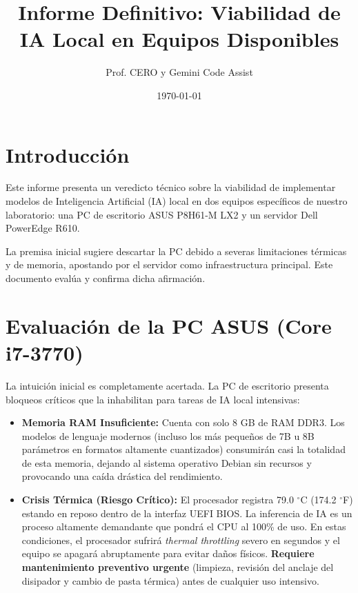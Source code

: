 \documentclass[12pt,a4paper]{article}
\title{Informe Definitivo: Viabilidad de IA Local en Equipos Disponibles}
\author{Prof. CERO y Gemini Code Assist}
\date{\today}
\begin{document}
\maketitle

\section{Introducción}
Este informe presenta un veredicto técnico sobre la viabilidad de implementar modelos de Inteligencia Artificial (IA) local en dos equipos específicos de nuestro laboratorio: una PC de escritorio ASUS P8H61-M LX2 y un servidor Dell PowerEdge R610. 

La premisa inicial sugiere descartar la PC debido a severas limitaciones térmicas y de memoria, apostando por el servidor como infraestructura principal. Este documento evalúa y confirma dicha afirmación.

\section{Evaluación de la PC ASUS (Core i7-3770)}
La intuición inicial es completamente acertada. La PC de escritorio presenta bloqueos críticos que la inhabilitan para tareas de IA local intensivas:
\begin{itemize}
    \item \textbf{Memoria RAM Insuficiente:} Cuenta con solo 8 GB de RAM DDR3. Los modelos de lenguaje modernos (incluso los más pequeños de 7B u 8B parámetros en formatos altamente cuantizados) consumirán casi la totalidad de esta memoria, dejando al sistema operativo Debian sin recursos y provocando una caída drástica del rendimiento.
    \item \textbf{Crisis Térmica (Riesgo Crítico):} El procesador registra 79.0 $^\circ$C (174.2 $^\circ$F) estando en reposo dentro de la interfaz UEFI BIOS. La inferencia de IA es un proceso altamente demandante que pondrá el CPU al 100\% de uso. En estas condiciones, el procesador sufrirá \textit{thermal throttling} severo en segundos y el equipo se apagará abruptamente para evitar daños físicos. \textbf{Requiere mantenimiento preventivo urgente} (limpieza, revisión del anclaje del disipador y cambio de pasta térmica) antes de cualquier uso intensivo.
\end{itemize}
\end{document}
